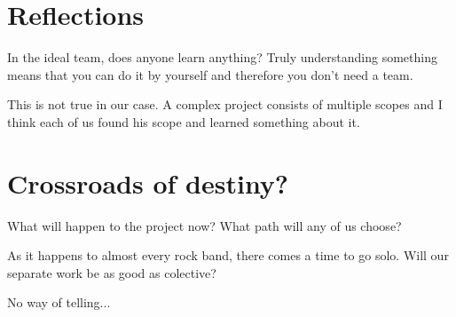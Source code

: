 \documentclass[12pt,a4paper]{article}
\begin{document}
	\section*{Reflections}
		In the ideal team, does anyone learn anything? Truly understanding something means that you can do it by yourself and therefore you don't need a team.
		
		This is not true in our case. A complex project consists of multiple scopes and I think each of us found his scope and learned something about it.

	
	\section*{Crossroads of destiny?}
                What will happen to the project now? What path will any of us choose?


                As it happens to almost every rock band, there comes a time to go solo. Will our separate work be as good as colective?


                No way of telling...
	
\end{document}
